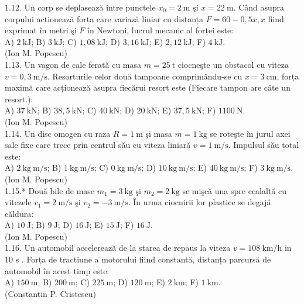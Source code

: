 \documentclass[10pt]{article}
\begin{document}
1.12. Un corp se deplasează între punctele $x_{0}=2 \mathrm{~m}$ şi $x=22 \mathrm{~m}$. Când asupra corpului acționează forța care variază liniar cu distanța $F=60-0,5 x, x$ fiind exprimat în metri şi $F$ în Newtoni, lucrul mecanic al forței este:\\ A) $2 \mathrm{~kJ}$; B) $3 \mathrm{~kJ}$; C) $1,08 \mathrm{~kJ}$; D) $3,16 \mathrm{~kJ}$; E) $2,12 \mathrm{~kJ}$; F) $4 \mathrm{~kJ}$.\\ (Ion M. Popescu)\\

1.13. Un vagon de cale ferată cu masa $m=25 \mathrm{~t}$ ciocneşte un obstacol cu viteza $v=0,3 \mathrm{~m} / \mathrm{s}$. Resorturile celor două tampoane comprimându-se cu $x=3 \mathrm{~cm}$, forța maximă care acționează asupra fiecărui resort este (Fiecare tampon are câte un resort.):\\ A) $37 \mathrm{~kN}$; B) $38,5 \mathrm{~kN}$; C) $40 \mathrm{~kN}$; D) $20 \mathrm{~kN}$; E) $37,5 \mathrm{~kN}$; F) $1100 \mathrm{~N}$.\\ (Ion M. Popescu)\\

1.14. Un disc omogen cu raza $R=1 \mathrm{~m}$ şi masa $m=1 \mathrm{~kg}$ se roteşte în jurul axei sale fixe care trece prin centrul său cu viteza liniară $v=1 \mathrm{~m} / \mathrm{s}$. Impulsul său total este:\\ A) $2 \mathrm{~kg} \mathrm{~m} / \mathrm{s}$; B) $1 \mathrm{~kg} \mathrm{~m} / \mathrm{s}$; C) $0 \mathrm{~kg} \mathrm{~m} / \mathrm{s}$; D) $10 \mathrm{~kg} \mathrm{~m} / \mathrm{s}$; E) $40 \mathrm{~kg} \mathrm{~m} / \mathrm{s}$; F) $3 \mathrm{~kg} \mathrm{~m} / \mathrm{s}$.\\ (Ion M. Popescu)\\

1.15.* Două bile de mase $m_{1}=3 \mathrm{~kg}$ şi $m_{2}=2 \mathrm{~kg}$ se mişcă una spre cealaltă cu vitezele $v_{1}=2 \mathrm{~m} / \mathrm{s}$ şi $v_{2}=-3 \mathrm{~m} / \mathrm{s}$. În urma ciocnirii lor plastice se degajă căldura:\\ A) $10 \mathrm{~J}$; B) $9 \mathrm{~J}$; D) $16 \mathrm{~J}$; E) $15 \mathrm{~J}$; F) $16 \mathrm{~J}$.\\ (Ion M. Popescu)\\

1.16. Un automobil accelerează de la starea de repaus la viteza $v=108 \mathrm{~km} / \mathrm{h}$ in 10 s . Forța de tractiune a motorului fiind constantă, distanța parcursă de automobil în acest timp este:\\ A) $150 \mathrm{~m}$; B) $200 \mathrm{~m}$; C) $225 \mathrm{~m}$; D) $120 \mathrm{~m}$; E) $2 \mathrm{~km}$; F) $1 \mathrm{~km}$.\\ (Constantin P. Cristescu)\\
\end{document}
